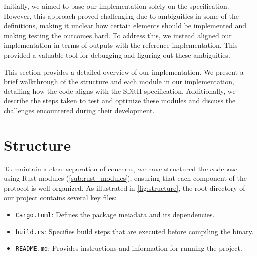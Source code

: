 \documentclass[11pt]{report}
\theoremstyle{definition}
\theoremstyle{plain}
\begin{document}
Initially, we aimed to base our implementation solely on the specification. However, this approach proved challenging due to ambiguities in some of the definitions, making it unclear how certain elements should be implemented and making testing the outcomes hard. To address this, we instead aligned our implementation in terms of outputs with the reference implementation. This provided a valuable tool for debugging and figuring out these ambiguities.

This section provides a detailed overview of our implementation. We present a brief walkthrough of the structure and each module in our implementation, detailing how the code aligns with the SDitH specification. Additionally, we describe the steps taken to test and optimize these modules and discuss the challenges encountered during their development.



\section{Structure}
To maintain a clear separation of concerns, we have structured the codebase using Rust modules (\autoref{sub:rust_modules}), ensuring that each component of the protocol is well-organized. As illustrated in \autoref{fig:structure}, the root directory of our project contains several key files:

\begin{itemize}
  \item \texttt{Cargo.toml}: Defines the package metadata and its dependencies.
  \item \texttt{build.rs}: Specifies build steps that are executed before compiling the binary.
  \item \texttt{README.md}: Provides instructions and information for running the project.
\end{itemize}
\end{document}
